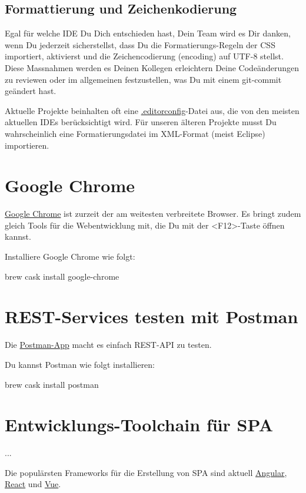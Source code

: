 \documentclass[]{article}
\begin{document}
\subsection{Formattierung und Zeichenkodierung }
Egal für welche IDE Du Dich entschieden hast, Dein Team wird es Dir danken, wenn Du jederzeit sicherstellst, dass Du die Formatierungs-Regeln der CSS importiert, aktivierst und die Zeichencodierung (encoding) auf UTF-8 stellst. Diese Massnahmen werden es Deinen Kollegen erleichtern Deine Codeänderungen zu reviewen oder im allgemeinen festzustellen, was Du mit einem git-commit geändert hast.

Aktuelle Projekte beinhalten oft eine \href{https://editorconfig.org/}{.editorconfig}-Datei aus, die von den meisten aktuellen IDEs berücksichtigt wird. Für unseren älteren Projekte musst Du wahrscheinlich eine Formatierungsdatei im XML-Format (meist Eclipse) importieren.

\section{Google Chrome}
\href{https://www.google.com/chrome/}{Google Chrome} ist zurzeit der am weitesten verbreitete Browser. Es bringt zudem gleich Tools für die Webentwicklung mit, die Du mit der <F12>-Taste öffnen kannst.

Installiere Google Chrome wie folgt:
\begin{bashcode}
brew cask install google-chrome
\end{bashcode}


\section{REST-Services testen mit Postman}
Die \href{https://www.getpostman.com/products}{Postman-App} macht es einfach REST-API zu testen. 

Du kannst Postman wie folgt installieren:
\begin{bashcode}
brew cask install postman
\end{bashcode}

\section{Entwicklungs-Toolchain für SPA}
...

Die populärsten Frameworks für die Erstellung von SPA sind aktuell \href{https://angular.io/}{Angular}, \href{https://reactjs.org/}{React} und \href{https://vuejs.org/}{Vue}.
\end{document}
